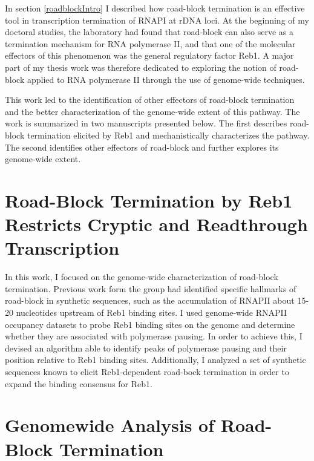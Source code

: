 
In section \ref{roadblockIntro} I described how road-block termination is an effective tool in transcription termination of RNAPI at rDNA loci. 
At the beginning of my doctoral studies, the laboratory had found that road-block can also serve as a termination mechanism for RNA polymerase II, and that one of the molecular effectors of this phenomenon was the general regulatory factor Reb1. 
A major part of my thesis work was therefore dedicated to exploring the notion of road-block applied to RNA polymerase II through the use of genome-wide techniques.

This work led to the identification of other effectors of road-block termination and the better characterization of the genome-wide extent of this pathway. 
The work is summarized in two manuscripts presented below. 
The first describes road-block termination elicited by Reb1 and mechanistically characterizes the pathway.
The second identifies other effectors of road-block and further explores its genome-wide extent.

\singlespacing
\section{Road-Block Termination by Reb1 Restricts Cryptic and Readthrough Transcription}
\doublespacing

In this work, I focused on the genome-wide characterization of road-block termination. 
Previous work form the group had identified specific hallmarks of road-block in synthetic sequences, such as the accumulation of RNAPII about 15-20 nucleotides upstream of Reb1 binding sites. 
I used genome-wide RNAPII occupancy datasets to probe Reb1 binding sites on the genome and determine whether they are associated with polymerase pausing. 
In order to achieve this, I devised an algorithm able to identify peaks of polymerase pausing and their position relative to Reb1 binding sites. 
Additionally, I analyzed a set of synthetic sequences known to elicit Reb1-dependent road-bock termination in order to expand the binding consensus for Reb1. 



\clearpage




\clearpage

\singlespacing
\section{Genomewide Analysis of Road-Block Termination}
\doublespacing


